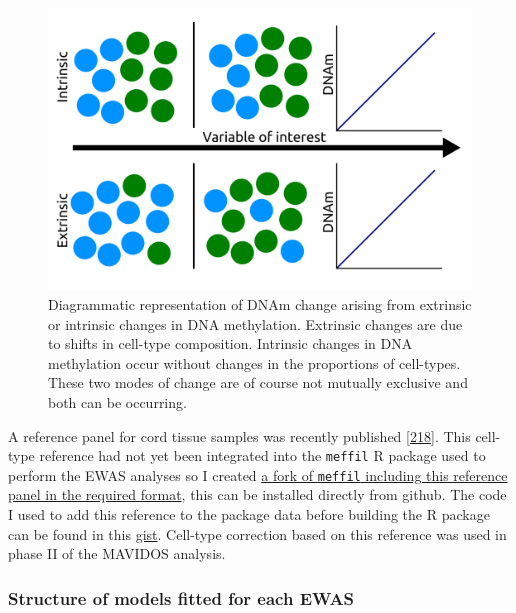 \documentclass[
]{book}
\begin{document}
\begin{figure}

{\centering \includegraphics[width=0.8\linewidth]{figs/IntrinsicVsExtrinsicDNAmChangeGeneral} 

}

\caption{Diagrammatic representation of DNAm change arising from extrinsic or intrinsic changes in DNA methylation. Extrinsic changes are due to shifts in cell-type composition. Intrinsic changes in DNA methylation occur without changes in the proportions of cell-types. These two modes of change are of course not mutually exclusive and both can be occurring.}\label{fig:IntrinsicVsExtrinsicDNAmChangeGeneral}
\end{figure}



A reference panel for cord tissue samples was recently published {[}\protect\hyperlink{ref-Lin2018}{218}{]}.
This cell-type reference had not yet been integrated into the \texttt{meffil} R package used to perform the EWAS analyses so I created \href{https://github.com/RichardJActon/meffil/blob/LinAndKarnaniCordTissueRef/data-raw/lin-karnani-reference.r}{a fork of \texttt{meffil} including this reference panel in the required format}, this can be installed directly from github.
The code I used to add this reference to the package data before building the R package can be found in this \href{https://gist.github.com/RichardJActon/703ae70438e865a37998cd608bd12cd3}{gist}.
Cell-type correction based on this reference was used in phase II of the MAVIDOS analysis.

\hypertarget{structure-of-models-fitted-for-each-ewas}{%
\subsubsection{Structure of models fitted for each EWAS}\label{structure-of-models-fitted-for-each-ewas}}
\end{document}
